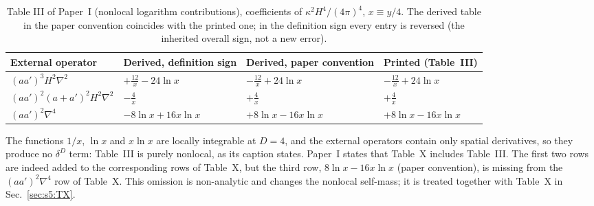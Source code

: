 \documentclass[aps,prd,onecolumn,10pt,nofootinbib,floatfix]{revtex4-2}
\newcommand{\PI}{Paper~I}
\begin{document}
\begin{table}[tb]
\caption{Table III of \PI{} (nonlocal logarithm contributions), coefficients of $\kappa^2H^4/(4\pi)^4$, $x\equiv y/4$.
The derived table in the paper convention coincides with the printed one; in the definition sign every entry is
reversed (the inherited overall sign, not a new error).}
\label{tab:s4b:III}
\renewcommand{\arraystretch}{1.3}
\begin{ruledtabular}
\begin{tabular}{@{}llll@{}}
External operator & Derived, definition sign & Derived, paper convention & Printed (Table~III)\\
\hline
$(aa')^3H^2\nabla^2$ & $+\frac{12}{x}-24\ln x$ & $-\frac{12}{x}+24\ln x$ & $-\frac{12}{x}+24\ln x$\\
$(aa')^2(a+a')^2H^2\nabla^2$ & $-\frac4x$ & $+\frac4x$ & $+\frac4x$\\
$(aa')^2\nabla^4$ & $-8\ln x+16x\ln x$ & $+8\ln x-16x\ln x$ & $+8\ln x-16x\ln x$\\
\end{tabular}
\end{ruledtabular}
\end{table}

The functions $1/x$, $\ln x$ and $x\ln x$ are locally integrable at $D=4$, and the external operators contain only
spatial derivatives, so they produce no $\delta^D$ term: Table~III is purely nonlocal, as its caption states.
\PI{} states that Table~X includes Table~III\@. The first two rows are indeed added to the corresponding rows of
Table~X, but the third row, $8\ln x-16x\ln x$ (paper convention), is missing from the $(aa')^2\nabla^4$ row of
Table~X\@. This omission is non-analytic and changes the nonlocal self-mass; it is treated together with Table~X in
Sec.~\ref{sec:s5:TX}.
\end{document}
